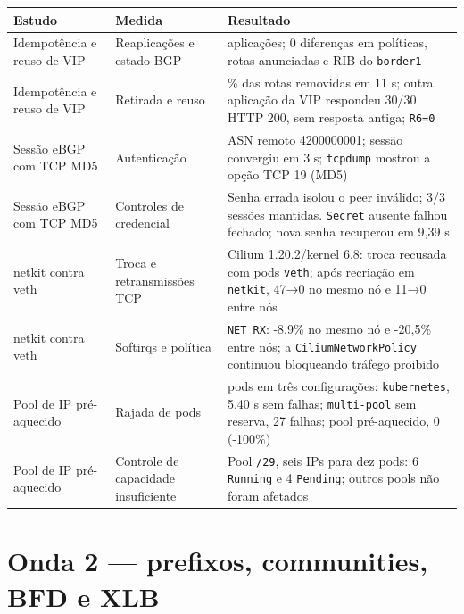 \documentclass[12pt,openany,oneside,a4paper,chapter=TITLE,english,brazil]{abntex2}
\begin{document}
\begin{quadro}[!htbp]
\caption{Resultados de idempotência, netkit e IPAM}
\footnotesize
\begin{tabularx}{\textwidth}{|>{\raggedright\arraybackslash\hsize=0.715\hsize}X|>{\raggedright\arraybackslash\hsize=0.815\hsize}X|>{\raggedright\arraybackslash\hsize=1.470\hsize}X|}
\hline
\textbf{Estudo} & \textbf{Medida} & \textbf{Resultado} \\
\hline
Idempotência e reuso de VIP & Reaplicações e estado BGP & 10 aplicações; 0 diferenças em políticas, rotas anunciadas e RIB do
\texttt{border1} \\
\hline
Idempotência e reuso de VIP & Retirada e reuso & 100\% das rotas removidas em 11 s; outra aplicação da VIP respondeu
30/30 HTTP 200, sem resposta antiga; \texttt{R6=\allowbreak{}0} \\
\hline
Sessão eBGP com TCP MD5 & Autenticação & ASN remoto 4200000001; sessão convergiu em 3 s; \texttt{tcpdump} mostrou
a opção TCP 19 (MD5) \\
\hline
Sessão eBGP com TCP MD5 & Controles de credencial & Senha errada isolou o peer inválido; 3/3 sessões mantidas.
\texttt{Secret} ausente falhou fechado; nova senha recuperou em 9,39 s \\
\hline
netkit contra veth & Troca e retransmissões TCP & Cilium 1.20.2/kernel 6.8: troca recusada com pods \texttt{veth}; após
recriação em \texttt{netkit}, 47→0 no mesmo nó e 11→0 entre nós \\
\hline
netkit contra veth & Softirqs e política & \texttt{NET\_\allowbreak{}RX}: -8,9\% no mesmo nó e -20,5\% entre nós; a
\texttt{Cilium\allowbreak{}Network\allowbreak{}Policy} continuou
bloqueando tráfego proibido \\
\hline
Pool de IP pré-aquecido & Rajada de pods & 16 pods em três configurações: \texttt{kubernetes}, 5,40 s sem falhas;
\texttt{multi-{}\allowbreak{}pool} sem reserva, 27 falhas; pool
pré-aquecido, 0 (-100\%) \\
\hline
Pool de IP pré-aquecido & Controle de capacidade insuficiente & Pool \texttt{/\allowbreak{}29}, seis IPs para dez pods: 6
\texttt{Running} e 4 \texttt{Pending}; outros pools não foram afetados \\
\hline
\end{tabularx}
\end{quadro}

\section{Onda 2 --- prefixos, communities, BFD e XLB}\label{onda-2-prefixos-communities-bfd-e-xlb}
\end{document}
